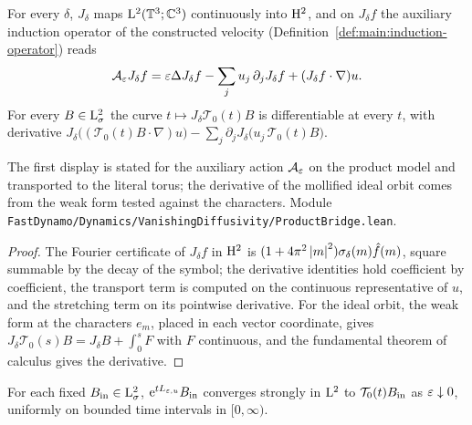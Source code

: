 \begin{lemma}
  \label{lem:vanishing:bridge}
  \leanok
  For every $\delta$, $J_\delta$ maps $\mathrm{L}^2(\mathbb{T}^3;\mathbb{C}^3)$ continuously into $\mathrm{H}^2$, and on
  $J_\delta f$ the auxiliary induction operator of the constructed velocity
  (Definition~\ref{def:main:induction-operator}) reads
  \[
    \mathcal A_\varepsilon J_\delta f=\varepsilon\Delta J_\delta f-\sum_ju_j\,\partial_jJ_\delta f
    +(J_\delta f\cdot\nabla)u .
  \]
  For every $B\in\mathrm{L}^2_\sigma$ the curve $t\mapsto J_\delta\mathcal T_0(t)B$ is differentiable
  at every $t$, with derivative
  $J_\delta\bigl((\mathcal T_0(t)B\cdot\nabla)u\bigr)-\sum_j\partial_jJ_\delta\bigl(u_j\,\mathcal T_0(t)B\bigr)$.
\end{lemma}

The first display is stated for the auxiliary action $\mathcal A_\varepsilon$ on the product model and
transported to the literal torus; the derivative of the mollified ideal orbit comes from the
weak form tested against the characters.  Module
\texttt{FastDynamo/Dynamics/VanishingDiffusivity/ProductBridge.lean}.

\begin{proof}
  \leanok
  The Fourier certificate of $J_\delta f$ in $\mathrm{H}^2$ is $(1+4\pi^2\left\lvert m\right\rvert^2)\sigma_\delta(m)\hat
  f(m)$, square summable by the decay of the symbol; the derivative identities hold coefficient
  by coefficient, the transport term is computed on the continuous representative of $u$, and the
  stretching term on its pointwise derivative.  For the ideal orbit, the weak form at the
  characters $e_m$, placed in each vector coordinate, gives
  $J_\delta\mathcal T_0(s)B=J_\delta B+\int_0^sF$ with $F$ continuous, and the fundamental
  theorem of calculus gives the derivative.
\end{proof}

\begin{theorem}
  \label{thm:vanishing-diffusivity}
  \leanok
  For each fixed $B_{\rm in}\in\mathrm{L}^2_\sigma$, $\mathrm{e}^{tL_{\varepsilon,u}}B_{\rm in}$ converges strongly in
  $\mathrm{L}^2$ to $\mathcal T_0(t)B_{\rm in}$ as $\varepsilon\downarrow0$, uniformly on bounded time
  intervals in $[0,\infty)$.
\end{theorem}

